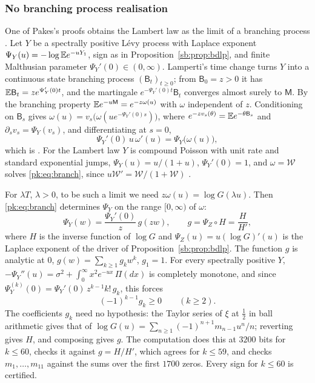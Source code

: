 \subsubsection{No branching process realisation}\label{pk:sec:nobranch}

One of Pakes's proofs obtains the Lambert law as the limit of a branching process \cite{Pakes20}. Let $Y$ be a spectrally positive L\'evy process with Laplace exponent $\Psi_Y(u)=-\log\mathbb{E} e^{-uY_1}$, sign as in Proposition~\ref{sb:prop:bdlp}, and finite Malthusian parameter $\Psi_Y'(0)\in(0,\infty)$. Lamperti's time change turns $Y$ into a continuous state branching process $(\mathsf B_t)_{t\ge0}$; from $\mathsf B_0=z>0$ it has $\mathbb{E}\mathsf B_t=ze^{\Psi_Y'(0)t}$, and the martingale $e^{-\Psi_Y'(0)t}\mathsf B_t$ converges almost surely to $\mathsf M$. By the branching property $\mathbb{E} e^{-u\mathsf M}=e^{-z\omega(u)}$ with $\omega$ independent of $z$. Conditioning on $\mathsf B_s$ gives $\omega(u)=v_s\big(\omega(ue^{-\Psi_Y'(0)s})\big)$, where $e^{-zv_s(\theta)}=\mathbb{E} e^{-\theta\mathsf B_s}$ and $\partial_sv_s=\Psi_Y(v_s)$, and differentiating at $s=0$,
\begin{equation}\label{pk:eq:branch}
\Psi_Y'(0)\,u\,\omega'(u)=\Psi_Y\big(\omega(u)\big),
\end{equation}
which is \cite[(68)]{Pakes26}. For the Lambert law $Y$ is compound Poisson with unit rate and standard exponential jumps, $\Psi_Y(u)=u/(1+u)$, $\Psi_Y'(0)=1$, and $\omega=\mathcal W$ solves \eqref{pk:eq:branch}, since $u\mathcal W'=\mathcal W/(1+\mathcal W)$ \cite[Section 7]{Pakes26}.

For $\lambda T$, $\lambda>0$, to be such a limit we need $z\omega(u)=\log G(\lambda u)$. Then \eqref{pk:eq:branch} determines $\Psi_Y$ on the range $[0,\infty)$ of $\omega$:
\[
\Psi_Y(w)=\frac{\Psi_Y'(0)}z\,g(zw),\qquad g=\Psi_Z\circ H=\frac H{H'},
\]
where $H$ is the inverse function of $\log G$ and $\Psi_Z(u)=u(\log G)'(u)$ is the Laplace exponent of the driver of Proposition~\ref{sb:prop:bdlp}. The function $g$ is analytic at $0$, $g(w)=\sum_{k\ge1}g_kw^k$, $g_1=1$. For every spectrally positive $Y$, $-\Psi_Y''(u)=\sigma^2+\int_0^\infty x^2e^{-ux}\,\Pi(dx)$ is completely monotone, and since $\Psi_Y^{(k)}(0)=\Psi_Y'(0)\,z^{k-1}k!\,g_k$, this forces
\begin{equation}\label{pk:eq:pattern}
(-1)^{k-1}g_k\ge0\qquad(k\ge2).
\end{equation}
The coefficients $g_k$ need no hypothesis: the Taylor series of $\xi$ at $\frac12$ in ball arithmetic gives that of $\log G(u)=\sum_{n\ge1}(-1)^{n+1}m_{n-1}u^n/n$; reverting gives $H$, and composing gives $g$. The computation does this at $3200$ bits for $k\le60$, checks it against $g=H/H'$, which agrees for $k\le59$, and checks $m_1,\dots,m_{11}$ against the sums over the first $1700$ zeros. Every sign for $k\le60$ is certified.

